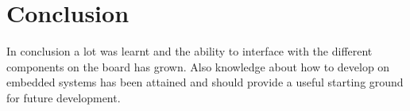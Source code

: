\documentclass[a4paper,12pt]{scrartcl}
\begin{document}
	\section{Conclusion}
	{
		In conclusion a lot was learnt and the ability to interface with the different components on the board has grown. Also knowledge about how to develop on embedded systems has been attained and should provide a useful starting ground for future development.
	}
	
	\newpage
	
	\printbibliography[heading=bibintoc,title=References]
\end{document}
